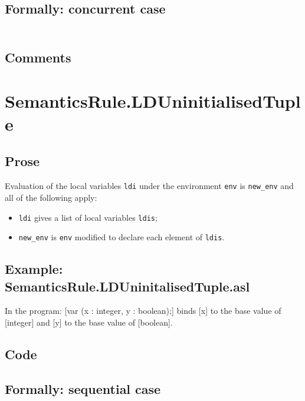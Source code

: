 \documentclass{book}
\begin{document}
  \subsection{Formally: concurrent case}
  \begin{align}
  \end{align} 

    \subsection{Comments}

\section{SemanticsRule.LDUninitialisedTuple \label{sec:SemanticsRule.LDUninitialisedTuple}}

    \subsection{Prose}
Evaluation of the local variables \texttt{ldi} under the environment
\texttt{env} is \texttt{new\_env} and all of the following apply:
    \begin{itemize}
    \item \texttt{ldi} gives a list of local variables \texttt{ldis};
    \item \texttt{new\_env} is \texttt{env} modified to declare each element of \texttt{ldis}.
    \end{itemize}

    \subsection{Example: SemanticsRule.LDUninitalisedTuple.asl}
    In the program:
    [var (x : integer, y : boolean);] binds [x] to the base value of [integer]
    and [y] to the base value of [boolean].

  \subsection{Code}

  \subsection{Formally: sequential case}
  \begin{align}
  \end{align} 
\end{document}
